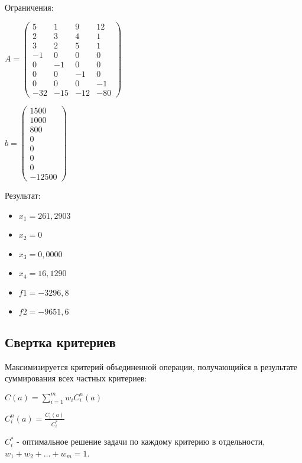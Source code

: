 Ограничения:

$A =
\begin{pmatrix}
  5 & 1 & 9 & 12 \\
  2 & 3 & 4 & 1 \\
  3 & 2 & 5 & 1 \\
  -1& 0 & 0 & 0 \\
  0 &-1 & 0 & 0 \\
  0 & 0 &-1 & 0 \\
  0 & 0 & 0 & -1 \\
  -32 & -15 & -12 & -80
\end{pmatrix}$

$b =
\begin{pmatrix}
  1500 \\
  1000 \\
  800 \\
  0 \\
  0 \\
  0 \\
  0 \\
  -12500
\end{pmatrix}$

\newpage


Результат:
\begin{itemize}
\item $x_1 = 261,2903$
\item $x_2 = 0$
\item $x_3 = 0,0000$
\item $x_4 = 16,1290$
\item $f1 = -3296,8$
\item $f2 = -9651,6$
\end{itemize}

\subsection{Свертка критериев}

Максимизируется критерий объединенной операции, получающийся в результате суммирования всех частных критериев:

$C(a)=\sum\limits_{i=1}^m w_i C_i^n (a)$

$C_i^n (a)=\frac{C_i (a)}{C_i^*}$

$C_i^*$ - оптимальное решение задачи по каждому критерию в отдельности, $w_1+w_2+\dots+w_m=1$.



